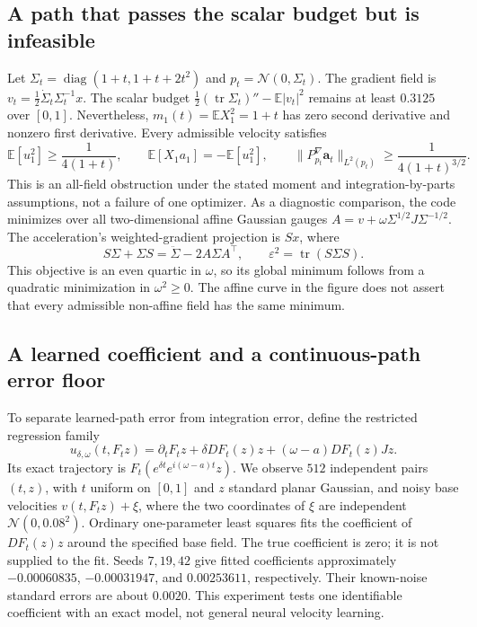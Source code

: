 \subsection{A path that passes the scalar budget but is infeasible}
Let $\Sigma_t=\operatorname{diag}(1+t,1+t+2t^2)$ and $p_t=\mathcal N(0,\Sigma_t)$. The gradient field is
$v_t=\frac12\dot\Sigma_t\Sigma_t^{-1}x$.
The scalar budget $\frac12(\operatorname{tr}\Sigma_t)''-\mathbb E|v_t|^2$ remains at least $0.3125$ over $[0,1]$. Nevertheless, $m_1(t)=\mathbb E X_1^2=1+t$ has zero second derivative and nonzero first derivative. Every admissible velocity satisfies
\[
 \mathbb E[u_1^2]\ge\frac1{4(1+t)},\qquad
 \mathbb E[X_1a_1]=-\mathbb E[u_1^2],\qquad
 \|P_{p_t}^{\nabla}\mathbf a_t\|_{L^2(p_t)}
 \ge\frac1{4(1+t)^{3/2}}.
\]
This is an all-field obstruction under the stated moment and integration-by-parts assumptions, not a failure of one optimizer.
As a diagnostic comparison, the code minimizes over all two-dimensional affine Gaussian gauges $A=v+\omega\Sigma^{1/2}J\Sigma^{-1/2}$. The acceleration's weighted-gradient projection is $Sx$, where
\[
 S\Sigma+\Sigma S=\ddot\Sigma-2A\Sigma A^\top,\qquad
 \varepsilon^2=\operatorname{tr}(S\Sigma S).
\]
This objective is an even quartic in $\omega$, so its global minimum follows from a quadratic minimization in $\omega^2\ge0$. The affine curve in the figure does not assert that every admissible non-affine field has the same minimum.

\subsection{A learned coefficient and a continuous-path error floor}
To separate learned-path error from integration error, define the restricted regression family
\[
 u_{\delta,\omega}(t,F_tz)
 =\partial_tF_tz+\delta D F_t(z)z+(\omega-a)D F_t(z)Jz.
\]
Its exact trajectory is $F_t(e^{\delta t}e^{i(\omega-a)t}z)$.
We observe $512$ independent pairs $(t,z)$, with $t$ uniform on $[0,1]$ and $z$ standard planar Gaussian, and noisy base velocities $v(t,F_tz)+\xi$, where the two coordinates of $\xi$ are independent $\mathcal N(0,0.08^2)$. Ordinary one-parameter least squares fits the coefficient of $D F_t(z)z$ around the specified base field. The true coefficient is zero; it is not supplied to the fit. Seeds $7,19,42$ give fitted coefficients approximately $-0.00060835$, $-0.00031947$, and $0.00253611$, respectively. Their known-noise standard errors are about $0.0020$. This experiment tests one identifiable coefficient with an exact model, not general neural velocity learning.

